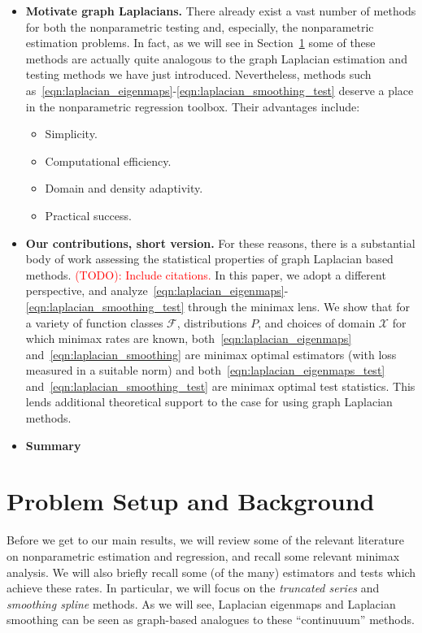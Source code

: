 \documentclass{article}
\newcommand{\1}{\mathbf{1}}
\newcommand{\mc}[1]{\mathcal{#1}}
\theoremstyle{alden}
\theoremstyle{aldenthm}
\theoremstyle{definition}
\theoremstyle{remark}
\begin{document}
\begin{itemize}
	\item \textbf{Motivate graph Laplacians.} There already exist a vast number of methods for both the nonparametric testing and, especially, the nonparametric estimation problems. In fact, as we will see in Section~\ref{sec:problem_setup_and_background} some of these methods are actually quite analogous to the graph Laplacian estimation and testing methods we have just introduced. Nevertheless, methods such as~\eqref{eqn:laplacian_eigenmaps}-\eqref{eqn:laplacian_smoothing_test} deserve a place in the nonparametric regression toolbox. Their advantages include:
	\begin{itemize}
		\item Simplicity.
		\item Computational efficiency.
		\item Domain and density adaptivity.
		\item Practical success.
	\end{itemize}
	\item \textbf{Our contributions, short version.} For these reasons, there is a  substantial body of work assessing the statistical properties of graph Laplacian based methods. \textcolor{red}{(TODO): Include citations.} In this paper, we adopt a different perspective, and analyze~\eqref{eqn:laplacian_eigenmaps}-\eqref{eqn:laplacian_smoothing_test} through the minimax lens. We show that for a variety of function classes $\mc{F}$, distributions $P$, and choices of domain $\mc{X}$ for which minimax rates are known, both~\eqref{eqn:laplacian_eigenmaps} and~\eqref{eqn:laplacian_smoothing} are minimax optimal estimators (with loss measured in a suitable norm) and both~\eqref{eqn:laplacian_eigenmaps_test} and~\eqref{eqn:laplacian_smoothing_test} are minimax optimal test statistics. This lends additional theoretical support to the case for using graph Laplacian methods.
	\item \textbf{Summary}
\end{itemize}

\section{Problem Setup and Background}
\label{sec:problem_setup_and_background}

Before we get to our main results, we will review some of the relevant literature on nonparametric estimation and regression, and recall some relevant minimax analysis.  We will also briefly recall some (of the many) estimators and tests which achieve these rates. In particular, we will focus on the \emph{truncated series} and \emph{smoothing spline} methods. As we will see, Laplacian eigenmaps and Laplacian smoothing can be seen as graph-based analogues to these ``continuuum'' methods.
\end{document}
